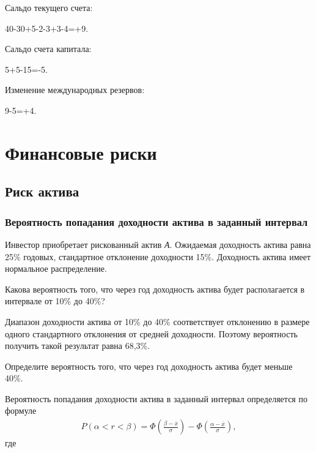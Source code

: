 \documentclass[12pt, table, a4paper,twoside]{exam}
\begin{document}
\begin{questions}
\begin{solution}[12em]
	
	\raggedright
	Сальдо текущего счета:
	
	40-30+5-2-3+3-4=+9.
	
	Сальдо счета капитала:
	
	5+5-15=-5.
	
	Изменение международных резервов:
	
	9-5=+4.

\end{solution}

\cleardoublepage
\section{Финансовые риски}
\subsection{Риск актива}

\subsubsection{Вероятность попадания доходности актива в заданный интервал}
\question[20] Инвестор приобретает рискованный актив \textit{А}. Ожидаемая доходность актива равна 25\% годовых, стандартное отклонение доходности 15\%. Доходность актива имеет нормальное распределение. 
\noaddpoints
\begin{subparts}
	\subpart[5] Какова вероятность того, что через год доходность актива будет располагается в интервале от 10\% до 40\%?
	
	\begin{solution}[12em]
		
		\raggedright
		Диапазон доходности актива от 10\% до 40\% соответствует отклонению в размере одного стандартного отклонения от средней доходности. Поэтому вероятность получить такой результат равна 68,3\%.
	\end{solution}
	
	\subpart[10] Определите вероятность того, что через год доходность актива будет меньше 40\%.
	
	\begin{solution}[12em]
		
		\raggedright
		Вероятность   попадания   доходности   актива   в   заданный интервал определяется по формуле 
		\begin{align}
		\label{prob_loss}
		P(\alpha<r<\beta)=\Phi\left(\frac{\beta-\overline{x}}{\sigma}\right)-\Phi\left(\frac{\alpha-\overline{x}}{\sigma}\right),
		\end{align}
		где 
		

\end{solution}
\end{subparts}
\end{questions}
\end{document}
